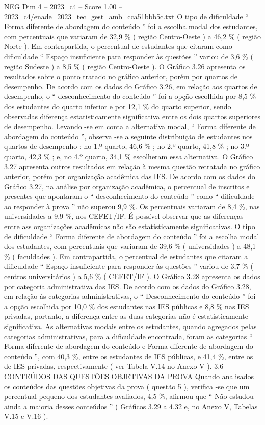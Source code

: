 \begin{textsample}{NEG Dim 4 – 2023\_c4 – Score 1.00 – 2023\_c4/enade\_2023\_tec\_gest\_amb\_cca51bbb5c.txt}
O tipo de dificuldade “ Forma diferente de abordagem do conteúdo ” foi a escolha modal dos estudantes, com percentuais que variaram de 32,9 \% ( região Centro-Oeste ) a 46,2 \% ( região Norte ).
Em contrapartida, o percentual de estudantes que citaram como dificuldade “ Espaço insuficiente para responder às questões ” variou de 3,6 \% ( região Sudeste ) a 8,5 \% ( região Centro-Oeste ).
O Gráfico 3.26 apresenta os resultados sobre o ponto tratado no gráfico anterior, porém por quartos de desempenho.
De acordo com os dados do Gráfico 3.26, em relação aos quartos de desempenho, o “ desconhecimento do conteúdo ” foi a opção escolhida por 8,5 \% dos estudantes do quarto inferior e por 12,1 \% do quarto superior, sendo observadas diferença estatisticamente significativa entre os dois quartos superiores de desempenho.
Levando -se em conta a alternativa modal, “ Forma diferente de abordagem do conteúdo ”, observa -se a seguinte distribuição de estudantes nos quartos de desempenho : no 1.º quarto, 46,6 \% ; no 2.º quarto, 41,8 \% ; no 3.º quarto, 42,3 \% ; e, no 4.º quarto, 34,1 \% escolheram essa alternativa.
O Gráfico 3.27 apresenta outros resultados em relação à mesma questão retratada no gráfico anterior, porém por organização acadêmica das IES.
De acordo com os dados do Gráfico 3.27, na análise por organização acadêmica, o percentual de inscritos e presentes que apontaram o “ desconhecimento do conteúdo ” como “ dificuldade ao responder à prova ” não superou 9,9 \%.
Os percentuais variaram de 8,4 \%, nas universidades a 9,9 \%, nos CEFET/IF.
É possível observar que as diferenças entre ass organizações acadêmicas não são estatisticamente significativas.
O tipo de dificuldade “ Forma diferente de abordagem do conteúdo ” foi a escolha modal dos estudantes, com percentuais que variaram de 39,6 \% ( universidades ) a 48,1 \% ( faculdades ).
Em contrapartida, o percentual de estudantes que citaram a dificuldade “ Espaço insuficiente para responder às questões ” variou de 3,7 \% ( centros universitários ) a 5,6 \% ( CEFET/IF ).
O Gráfico 3.28 apresenta os dados por categoria administrativa das IES.
De acordo com os dados do Gráfico 3.28, em relação às categorias administrativas, o “ Desconhecimento do conteúdo ” foi a opção escolhida por 10,0 \% dos estudantes nas IES públicas e 8,8 \% nas IES privadas, portanto, a diferença entre as duas categorias não é estatisticamente significativa.
As alternativas modais entre os estudantes, quando agregados pelas categorias administrativas, para a dificuldade encontrada, foram as categorias “ Forma diferente de abordagem do conteúdo e Forma diferente de abordagem do conteúdo ”, com 40,3 \%, entre os estudantes de IES públicas, e 41,4 \%, entre os de IES privadas, respectivamente ( ver Tabela V.14 no Anexo V ). 3.6 CONTEÚDOS DAS QUESTÕES OBJETIVAS DA PROVA Quando analisados os conteúdos das questões objetivas da prova ( questão 5 ), verifica -se que um percentual pequeno dos estudantes avaliados, 4,5 \%, afirmou que “ Não estudou ainda a maioria desses conteúdos ” ( Gráficos 3.29 a 4.32 e, no Anexo V, Tabelas V.15 e V.16 ).

\end{textsample}
